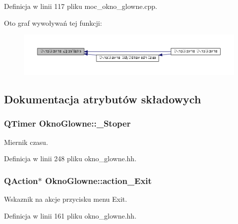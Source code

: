 Definicja w linii 117 pliku moc\+\_\+okno\+\_\+glowne.\+cpp.



Oto graf wywoływań tej funkcji\+:
\nopagebreak
\begin{figure}[H]
\begin{center}
\leavevmode
\includegraphics[width=350pt]{class_okno_glowne_aa602a0c5a940f0af4ab7390bfc1a4b9d_icgraph}
\end{center}
\end{figure}




\subsection{Dokumentacja atrybutów składowych}
\hypertarget{class_okno_glowne_a5d047f90666212f58e69d11af3285d9b}{}
\subsubsection[{\+\_\+\+Stoper}]{\setlength{\rightskip}{0pt plus 5cm}Q\+Timer Okno\+Glowne\+::\+\_\+\+Stoper\hspace{0.3cm}{\ttfamily [private]}}\label{class_okno_glowne_a5d047f90666212f58e69d11af3285d9b}
Miernik czasu. 

Definicja w linii 248 pliku okno\+\_\+glowne.\+hh.

\hypertarget{class_okno_glowne_a579ef9901f57057368cb522ea5a9a5c3}{}
\subsubsection[{action\+\_\+\+Exit}]{\setlength{\rightskip}{0pt plus 5cm}Q\+Action$\ast$ Okno\+Glowne\+::action\+\_\+\+Exit}\label{class_okno_glowne_a579ef9901f57057368cb522ea5a9a5c3}
Wskaznik na akcje przycisku menu Exit. 

Definicja w linii 161 pliku okno\+\_\+glowne.\+hh.

\hypertarget{class_okno_glowne_a2c2d825b6e5e0faa5eb368be4fc73b78}{}
